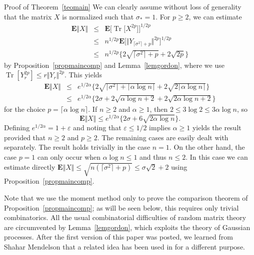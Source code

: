 \documentclass[aop,MSNbibl,dvips]{arximspdf}
\newcommand{\rrVert}{\Vert}
\newcommand{\llVert}{\Vert}
\newcommand{\EE}{\mathbf{E}}
\newcommand{\Tr}{\operatorname{Tr}}
\begin{document}
\begin{pf*}{Proof of Theorem~\ref{teomain}}
We can clearly assume without loss of generality that the matrix $X$ is
normalized such that $\sigma_*=1$. For $p\ge2$, we can estimate
%
\begin{eqnarray*}
\EE\llVert X\rrVert&\le&\EE\bigl[\Tr\bigl[X^{2p}\bigr]
\bigr]^{1/2p}
\\
&\le& n^{1/2p} \EE\bigl[\llVert Y_{\lceil\sigma^2\rceil+p}\rrVert^{2p}
\bigr]^{1/2p}
\\
&\le& n^{1/2p}\bigl\{2\sqrt{\bigl\lceil\sigma^2\bigr
\rceil+p}+2\sqrt{2p}\bigr\}
\end{eqnarray*}
%
by Proposition~\ref{propmaincomp} and
Lemma~\ref{lemgordon},
where we use $\Tr[Y_r^{2p}]\le r\llVert Y_r\rrVert ^{2p}$. This yields
%
\begin{eqnarray*}
\EE\llVert X\rrVert&\le& e^{1/2\alpha}\bigl\{2\sqrt{\bigl\lceil
\sigma^2\bigr\rceil+ \lceil\alpha\log n\rceil}+2\sqrt{2\lceil\alpha
\log n\rceil}\bigr\}
\\
&\le& e^{1/2\alpha}\{2\sigma+ 2\sqrt{\alpha\log n + 2} +2\sqrt{2\alpha
\log
n+2}\}
\end{eqnarray*}
%
for the choice $p = \lceil\alpha\log n\rceil$. If $n\ge2$ and
$\alpha\ge1$, then $2\le3\log2\le3\alpha\log n$, so
%
\[
\EE\llVert X\rrVert\le e^{1/2\alpha}\{2\sigma+ 6\sqrt{2\alpha\log n}\}.
%
\]
%
Defining $e^{1/2\alpha}=1+\varepsilon$ and noting that
$\varepsilon\le1/2$ implies $\alpha\ge1$ yields the result provided that
$n\ge2$ and $p\ge2$. The remaining cases are easily dealt with
separately. The result holds trivially in the case $n=1$. On the other
hand, the case $p=1$ can only occur when $\alpha\log n\le1$ and thus
$n\le2$. In this case we can estimate directly
$\EE\llVert X\rrVert \le\sqrt{n(\lceil\sigma^2\rceil+p)}\le
\sigma\sqrt{2}+2$ using Proposition~\ref{propmaincomp}.
\end{pf*}

%
\begin{rem}
Note that we use the moment method only to prove the comparison theorem
of Proposition~\ref{propmaincomp}; as will be seen below, this requires
only trivial combinatorics. All the usual combinatorial difficulties of
random matrix theory are circumvented by Lemma~\ref{lemgordon}, which
exploits the theory of Gaussian processes. After the first version of
this paper was posted, we learned from Shahar Mendelson that a related
idea has been used in \cite{Aub07} for a different purpose.
\end{rem}
\end{document}
